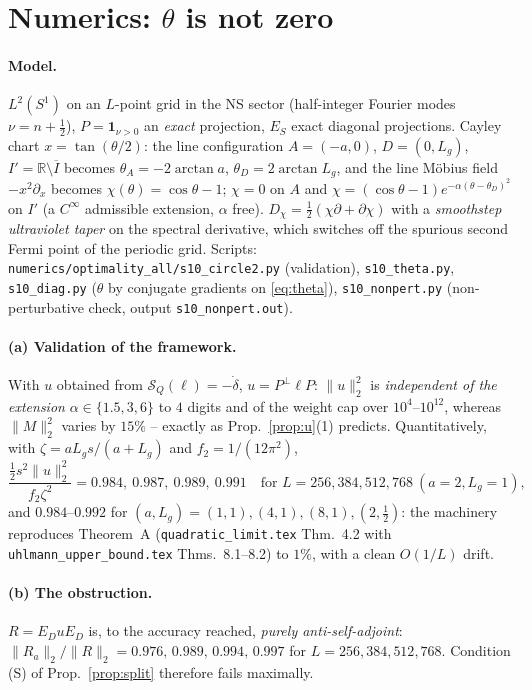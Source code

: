 \documentclass[11pt]{article}
\begin{document}
\section{Numerics: $\theta$ is not zero}\label{sec:num}

\paragraph{Model.}  $L^2(S^1)$ on an $L$-point grid in the NS sector (half-integer Fourier
modes $\nu=n+\frac12$), $P=\mathbf 1_{\nu>0}$ an \emph{exact} projection, $E_S$ exact
diagonal projections.  Cayley chart $x=\tan(\theta/2)$: the line configuration
$A=(-a,0)$, $D=(0,L_g)$, $I'=\mathbb R\setminus\overline I$ becomes
$\theta_A=-2\arctan a$, $\theta_D=2\arctan L_g$, and the line M\"obius field $-x^2\partial_x$
becomes $\chi(\theta)=\cos\theta-1$; $\chi=0$ on $A$ and
$\chi=(\cos\theta-1)e^{-\alpha(\theta-\theta_D)^2}$ on $I'$ (a $C^\infty$ admissible
extension, $\alpha$ free).  $D_\chi=\frac12(\chi\partial+\partial\chi)$ with a
\emph{smoothstep ultraviolet taper} on the spectral derivative, which switches off the
spurious second Fermi point of the periodic grid.  Scripts:
\texttt{numerics/optimality\_all/s10\_circle2.py} (validation),
\texttt{s10\_theta.py}, \texttt{s10\_diag.py} ($\theta$ by conjugate gradients on
\eqref{eq:theta}), \texttt{s10\_nonpert.py} (non-perturbative check, output
\texttt{s10\_nonpert.out}).

\paragraph{(a) Validation of the framework.}  With $u$ obtained from
$\mathcal S_Q(\ell)=-\dot\delta$, $u=P^\perp\ell P$:
$\|u\|_2^2$ is \emph{independent of the extension} $\alpha\in\{1.5,3,6\}$ to $4$ digits
and of the weight cap over $10^{4}$--$10^{12}$, whereas $\|M\|_2^2$ varies by $15\%$ --
exactly as Prop.~\ref{prop:u}(1) predicts.  Quantitatively, with
$\zeta=aL_gs/(a+L_g)$ and $f_2=1/(12\pi^2)$,
\[
 \frac{\tfrac12 s^2\|u\|_2^2}{f_2\zeta^2}=0.984,\ 0.987,\ 0.989,\ 0.991
 \quad\text{for }L=256,384,512,768\ (a=2,L_g=1),
\]
and $0.984$--$0.992$ for $(a,L_g)=(1,1),(4,1),(8,1),(2,\tfrac12)$: the machinery
reproduces Theorem~A (\texttt{quadratic\_limit.tex} Thm.~4.2 with
\texttt{uhlmann\_upper\_bound.tex} Thms.~8.1--8.2) to $1\%$, with a clean $O(1/L)$ drift.

\paragraph{(b) The obstruction.}
$R=E_DuE_D$ is, to the accuracy reached, \emph{purely anti-self-adjoint}:
$\|R_a\|_2/\|R\|_2=0.976,\,0.989,\,0.994,\,0.997$ for $L=256,384,512,768$.  Condition
{\rm(S)} of Prop.~\ref{prop:split} therefore fails maximally.
\end{document}
